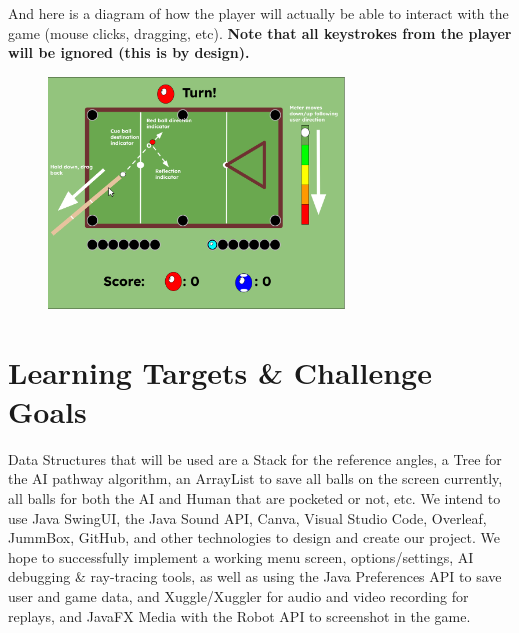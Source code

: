\documentclass[12pt]{article}
\begin{document}
And here is a diagram of how the player will actually be able to interact with the game (mouse clicks, dragging, etc). \textbf{Note that all keystrokes from the player will be ignored (this is by design).}

\FloatBarrier
\begin{figure}[htbp]
    \centering
    \includegraphics[width=0.7\textwidth]{diagram_gameframes.png}
    \label{fig:gameframes}
\end{figure}
\FloatBarrier


\newpage

\section{Learning Targets \& Challenge Goals}
Data Structures that will be used are a Stack for the reference angles, a Tree for the AI pathway algorithm, an ArrayList to save all balls on the screen currently, all balls for both the AI and Human that are pocketed or not, etc. We intend to use Java SwingUI, the Java Sound API, Canva, Visual Studio Code, Overleaf, JummBox, GitHub, and other technologies to design and create our project.
We hope to successfully implement a working menu screen, options/settings, AI debugging \& ray-tracing tools, as well as using the Java Preferences API to save user and game data, and Xuggle/Xuggler for audio and video recording for replays, and JavaFX Media with the Robot API to screenshot in the game.

\newpage
\clearpage
\end{document}
